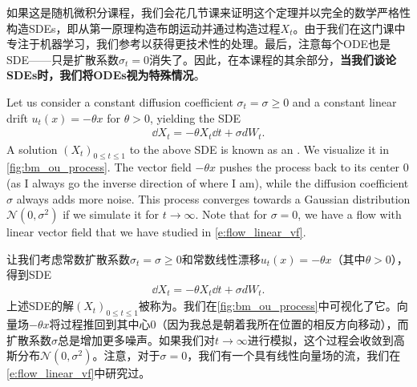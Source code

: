 如果这是随机微积分课程，我们会花几节课来证明这个定理并以完全的数学严格性构造SDEs，即从第一原理构造布朗运动并通过构造过程$X_{t}$。由于我们在这门课中专注于机器学习，我们参考\citep{mao2007stochastic}以获得更技术性的处理。最后，注意每个ODE也是SDE——只是扩散系数$\sigma_t=0$消失了。因此，在本课程的其余部分，\textbf{当我们谈论SDEs时，我们将ODEs视为特殊情况}。

\begin{examplebox}
Let us consider a constant diffusion coefficient $\sigma_t=\sigma\geq 0$ and a constant linear drift $u_t(x)=-\theta x$ for $\theta>0$, yielding the SDE
\begin{align}
\label{eq:ohrstein_uhlenbeck_process}
\dd X_t = -\theta X_t\dd t + \sigma dW_t.
\end{align} 
A solution $(X_t)_{0 \le t \le 1}$ to the above SDE is known as an . We visualize it in \cref{fig:bm_ou_process}. The vector field $-\theta x$ pushes the process back to its center $0$ (as I always go the inverse direction of where I am), while the diffusion coefficient $\sigma$ always adds more noise. This process converges towards a Gaussian distribution $\mathcal{N}(0,\sigma^2)$ if we simulate it for $t\to \infty$. Note that for $\sigma=0$, we have a flow with linear vector field that we have studied in \cref{e:flow_linear_vf}.

让我们考虑常数扩散系数$\sigma_t=\sigma\geq 0$和常数线性漂移$u_t(x)=-\theta x$（其中$\theta>0$），得到SDE
\begin{align}
\dd X_t = -\theta X_t\dd t + \sigma dW_t.
\end{align} 
上述SDE的解$(X_t)_{0 \le t \le 1}$被称为。我们在\cref{fig:bm_ou_process}中可视化了它。向量场$-\theta x$将过程推回到其中心$0$（因为我总是朝着我所在位置的相反方向移动），而扩散系数$\sigma$总是增加更多噪声。如果我们对$t\to \infty$进行模拟，这个过程会收敛到高斯分布$\mathcal{N}(0,\sigma^2)$。注意，对于$\sigma=0$，我们有一个具有线性向量场的流，我们在\cref{e:flow_linear_vf}中研究过。
\end{examplebox}


